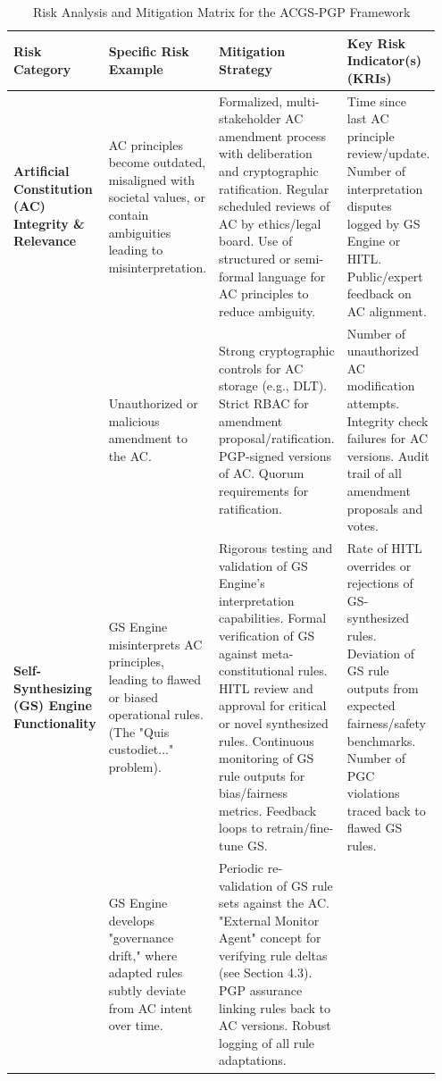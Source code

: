 \documentclass[sigconf,review,anonymous=false]{acmart} %
\begin{document}
\begin{table}[h!]
  \caption{Risk Analysis and Mitigation Matrix for the ACGS-PGP Framework}
  \label{tab:risk_mitigation_matrix}
  \begin{tabular}{@{}p{0.2\linewidth}p{0.25\linewidth}p{0.25\linewidth}p{0.25\linewidth}@{}}
    \toprule
    Risk Category & Specific Risk Example & Mitigation Strategy & Key Risk Indicator(s) (KRIs) \\
    \midrule
    \textbf{Artificial Constitution (AC) Integrity \& Relevance} &
    AC principles become outdated, misaligned with societal values, or contain ambiguities leading to misinterpretation. &
    Formalized, multi-stakeholder AC amendment process with deliberation and cryptographic ratification. Regular scheduled reviews of AC by ethics/legal board. Use of structured or semi-formal language for AC principles to reduce ambiguity. &
    Time since last AC principle review/update. Number of interpretation disputes logged by GS Engine or HITL. Public/expert feedback on AC alignment. \\
    \addlinespace
    & Unauthorized or malicious amendment to the AC. &
    Strong cryptographic controls for AC storage (e.g., DLT). Strict RBAC for amendment proposal/ratification. PGP-signed versions of AC. Quorum requirements for ratification. &
    Number of unauthorized AC modification attempts. Integrity check failures for AC versions. Audit trail of all amendment proposals and votes. \\
    \midrule
    \textbf{Self-Synthesizing (GS) Engine Functionality} &
    GS Engine misinterprets AC principles, leading to flawed or biased operational rules. (The "Quis custodiet..." problem). &
    Rigorous testing and validation of GS Engine's interpretation capabilities. Formal verification of GS against meta-constitutional rules. HITL review and approval for critical or novel synthesized rules. Continuous monitoring of GS rule outputs for bias/fairness metrics. Feedback loops to retrain/fine-tune GS. &
    Rate of HITL overrides or rejections of GS-synthesized rules. Deviation of GS rule outputs from expected fairness/safety benchmarks. Number of PGC violations traced back to flawed GS rules. \\
    \addlinespace
    & GS Engine develops "governance drift," where adapted rules subtly deviate from AC intent over time. &
    Periodic re-validation of GS rule sets against the AC. "External Monitor Agent" concept for verifying rule deltas (see Section 4.3). PGP assurance linking rules back to AC versions. Robust logging of all rule adaptations. &

\end{tabular}
\end{table}
\end{document}
